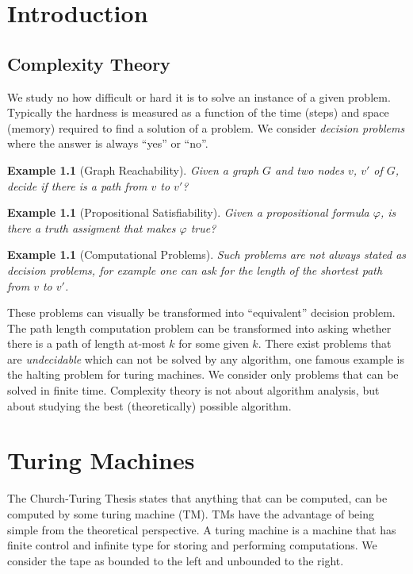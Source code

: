 \documentclass{report}
\newtheorem{example}[definition]{Example}
\begin{document}
\chapter{Introduction}
\section{Complexity Theory}
We study no how difficult or hard it is to solve an instance of a given problem. Typically the hardness is measured as a function of the time (steps) and space (memory) required to find a solution of a problem. We consider \textit{decision problems} where the answer is always ``yes'' or ``no''.

\begin{example}[Graph Reachability] Given a graph $G$ and two nodes $v$, $v'$ of $G$, decide if there is a path from $v$ to $v'$?
\end{example}

\begin{example}[Propositional Satisfiability] Given a propositional formula $\varphi$, is there a truth assigment that makes $\varphi$ true?
\end{example}

\begin{example}[Computational Problems] Such problems are not always stated as decision problems, for example one can ask for the length of the shortest path from $v$ to $v'$.
\end{example}

These problems can visually be transformed into ``equivalent'' decision problem. The path length computation problem can be transformed into asking whether there is a path of length at-most $k$ for some given $k$.
There exist problems that are \textit{undecidable} which can not be solved by any algorithm, one famous example is the halting problem for turing machines. We consider only problems that can be solved in finite time. Complexity theory is not about algorithm analysis, but about studying the best (theoretically) possible algorithm.

\chapter{Turing Machines}\label{sec:turing-machines}
The Church-Turing Thesis states that anything that can be computed, can be computed by some turing machine (TM). TMs have the advantage of being simple from the theoretical perspective. A turing machine is a machine that has finite control and infinite type for storing and performing computations. We consider the tape as bounded to the left and unbounded to the right.
\end{document}
